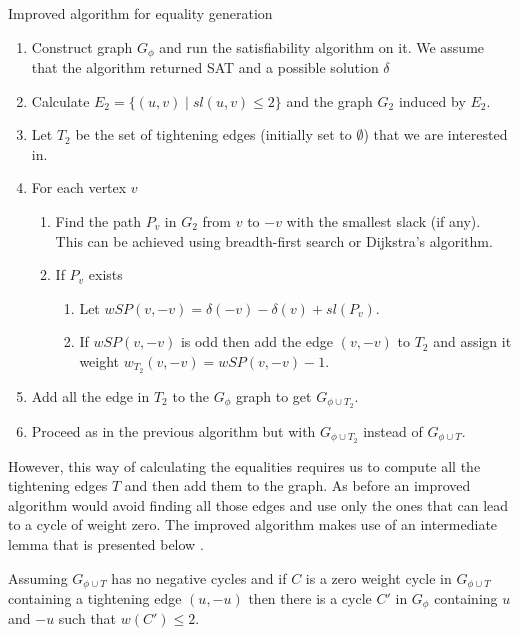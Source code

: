 \begin{table}
\caption{Improved algorithm for equality generation}
\label{tab:fast_eq}
\begin{enumerate}
\item Construct graph $G_\phi$ and run the satisfiability algorithm on it. We
  assume that the algorithm returned SAT and a possible solution $\delta$
\item Calculate $E_2 = \{ (u, v) \mid sl(u, v) \leq 2 \}$ and the graph $G_2$
  induced by $E_2$.
\item Let $T_2$ be the set of tightening edges (initially set to $\emptyset$)
  that we are interested in.
\item For each vertex $v$
  \begin{enumerate}
  \item Find the path $P_v$ in $G_2$ from $v$ to $-v$ with the smallest slack (if
    any). This can be achieved using breadth-first search or Dijkstra's
    algorithm.
  \item If $P_v$ exists
    \begin{enumerate}
    \item Let $wSP(v, -v) = \delta(-v) - \delta(v) + sl(P_v)$.
    \item If $wSP(v, -v)$ is odd then add the edge $(v, -v)$ to $T_2$ and assign
      it weight $w_{T_2}(v, -v) = wSP(v, -v) - 1$.
    \end{enumerate}
  \end{enumerate}
\item Add all the edge in $T_2$ to the $G_\phi$ graph to get
  $G_{\phi \cup T_2}$.
\item Proceed as in the previous algorithm but with
  $G_{\phi \cup T_2}$ instead of $G_{\phi \cup T}$.
\end{enumerate}
\end{table}
However, this way of calculating the equalities requires us to compute all the
tightening edges $T$ and then add them to the graph. As before an improved
algorithm would avoid finding all those edges and use only the ones that can
lead to a cycle of weight zero. The improved algorithm makes use of an
intermediate lemma that is presented below \cite{bib:ms_utvpi}.

\begin{lemma}
Assuming $G_{\phi \cup T}$ has no negative cycles and if $C$ is a zero weight
cycle in $G_{\phi \cup T}$ containing a tightening edge $(u, -u)$ then there is
a cycle $C'$ in $G_\phi$ containing $u$ and $-u$ such that $w(C') \leq 2$.
\end{lemma}

